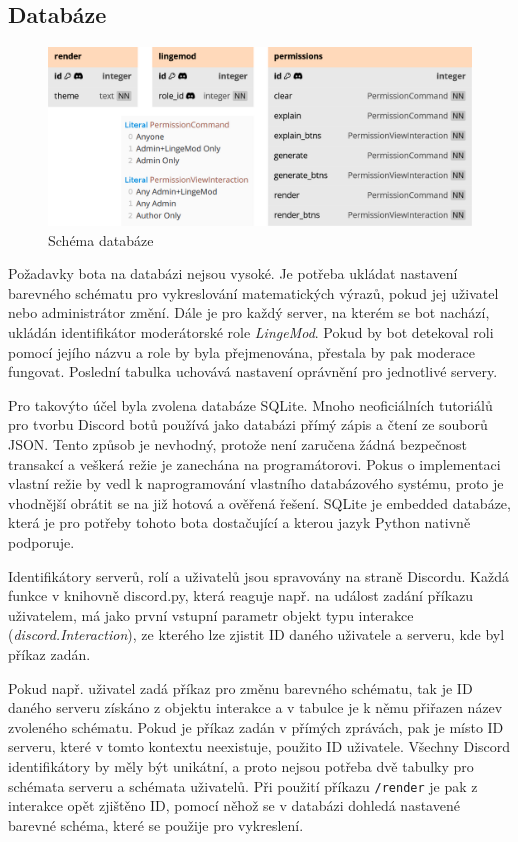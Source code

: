 \documentclass[FM]{tulthesis}
\begin{document}
	\subsection{Databáze}
	
	\begin{figure}[ht]
		\centering
		\includegraphics[width=\textwidth]{img/Database}
		\caption{Schéma databáze}
		\label{_tag_img_db}
	\end{figure}
	
	Požadavky bota na databázi nejsou vysoké. Je potřeba ukládat nastavení barevného schématu pro vykreslování matematických výrazů, pokud jej uživatel nebo administrátor změní. Dále je pro každý server, na kterém se bot nachází, ukládán identifikátor moderátorské role \textit{LingeMod}. Pokud by bot detekoval roli pomocí jejího názvu a role by byla přejmenována, přestala by pak moderace fungovat. Poslední tabulka uchovává nastavení oprávnění pro jednotlivé servery.
	
	Pro takovýto účel byla zvolena databáze SQLite. Mnoho neoficiálních tutoriálů pro tvorbu Discord botů používá jako databázi přímý zápis a čtení ze souborů JSON. Tento způsob je nevhodný, protože není zaručena žádná bezpečnost transakcí a veškerá režie je zanechána na programátorovi. Pokus o implementaci vlastní režie by vedl k naprogramování vlastního databázového systému, proto je vhodnější obrátit se na již hotová a ověřená řešení. SQLite je embedded databáze, která je pro potřeby tohoto bota dostačující a kterou jazyk Python nativně podporuje.
	
	Identifikátory serverů, rolí a uživatelů jsou spravovány na straně Discordu. Každá funkce v knihovně discord.py, která reaguje např. na událost zadání příkazu uživatelem, má jako první vstupní parametr objekt typu interakce (\textit{discord.Interaction}), ze kterého lze zjistit ID daného uživatele a serveru, kde byl příkaz zadán. 
	
	Pokud např. uživatel zadá příkaz pro změnu barevného schématu, tak je ID daného serveru získáno z objektu interakce a v tabulce je k němu přiřazen název zvoleného schématu. Pokud je příkaz zadán v přímých zprávách, pak je místo ID serveru, které v tomto kontextu neexistuje, použito ID uživatele. Všechny Discord identifikátory by měly být unikátní, a proto nejsou potřeba dvě tabulky pro schémata serveru a schémata uživatelů. Při použití příkazu \verb|/render| je pak z interakce opět zjištěno ID, pomocí něhož se v databázi dohledá nastavené barevné schéma, které se použije pro vykreslení.
	
\end{document}
